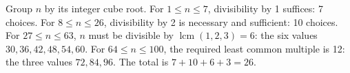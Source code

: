 Group $n$ by its integer cube root. For $1\le n\le7$, divisibility by 1 suffices: 7 choices. For $8\le n\le26$, divisibility by 2 is necessary and sufficient: 10 choices. For $27\le n\le63$, $n$ must be divisible by $\operatorname{lcm}(1,2,3)=6$: the six values $30,36,42,48,54,60$. For $64\le n\le100$, the required least common multiple is 12: the three values $72,84,96$. The total is $7+10+6+3=\boxed{26}$.

